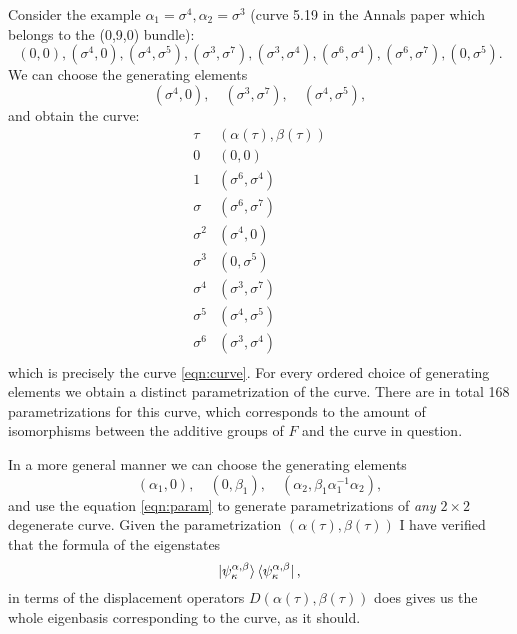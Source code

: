 \documentclass[a4paper]{article}
\begin{document}
  Consider the example $\alpha_1 = \sigma^{4}, \alpha_2 =
  \sigma^3$ (curve 5.19 in the Annals paper which belongs to
  the (0,9,0) bundle):
  \begin{equation}
    (0,0), (\sigma^{4},0), (\sigma^{4},\sigma^{5}),
    (\sigma^3,\sigma^{7}), (\sigma^3,\sigma^{4}), 
    (\sigma^{6},\sigma^{4}), (\sigma^{6},\sigma^{7}),
    (0,\sigma^{5}).
    \label{eqn:curve}
  \end{equation}
  We can choose the generating elements
  \begin{equation}
    (\sigma^4,0), \quad
    (\sigma^3,\sigma^7), \quad
    (\sigma^4,\sigma^5),
  \end{equation}
  and obtain the curve:
  \[
    \begin{array}{c|c}
      \tau & (\alpha(\tau), \beta(\tau)) \\[2mm]
      \hline
      0 & (0,0)\\
      1 & (\sigma^6,\sigma^4) \\
      \sigma & (\sigma^{6},\sigma^{7}) \\
      \sigma^2 & (\sigma^{4},0) \\
      \sigma^3 & (0,\sigma^{5}) \\
      \sigma^4 & (\sigma^{3},\sigma^{7})\\
      \sigma^5 & (\sigma^{4},\sigma^{5})\\
      \sigma^6 & (\sigma^3,\sigma^{4})\\
    \end{array}
  \] 
  which is precisely the curve \eqref{eqn:curve}. For every
  ordered choice of generating elements we obtain a distinct
  parametrization of the curve. There are in total 168
  parametrizations for this curve, which corresponds to the
  amount of isomorphisms between the additive groups of $F$
  and the curve in question.

  In a more general manner we can choose the generating
  elements
  \begin{equation}
    (\alpha_1,0), \quad 
    (0,\beta_1), \quad
    (\alpha_2,\beta_1\alpha_1^{-1}\alpha_2),
  \end{equation}
  and use the equation \eqref{eqn:param} to generate
  parametrizations of \textit{any} $2 \times 2$ degenerate
  curve. Given the parametrization
  $(\alpha(\tau),\beta(\tau))$ I have verified that the
  formula of the eigenstates
  \begin{equation}
    \ket{\psi_\kappa^{\alpha,\beta}}\bra{\psi_{\kappa}^{\alpha,\beta}},
  \end{equation}
  in terms of the displacement operators
  $D(\alpha(\tau),\beta(\tau))$ does gives us the whole
  eigenbasis corresponding to the curve, as it should.
\end{document}
